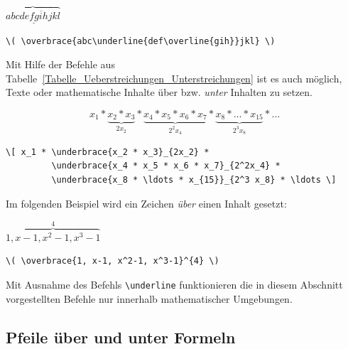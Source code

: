\documentclass[a4paper,10pt,twoside]{scrbook}
\begin{document}
{\begin{minipage}[c]{.3\textwidth}
\setlength{\parskip}{1em}
\centering
\( \overbrace{abc\underline{def\overline{gih}}jkl} \)
\end{minipage}
\hfill
\begin{minipage}[c]{.68\textwidth}
\setlength{\parskip}{1em}
\begin{lstlisting}[label=overbracebeispiel, style=customlatex]
\( \overbrace{abc\underline{def\overline{gih}}jkl} \)
\end{lstlisting}
\end{minipage}



Mit Hilfe der Befehle aus Tabelle~\ref{Tabelle_Ueberstreichungen_Unterstreichungen} 
ist es auch möglich, Texte oder mathematische Inhalte über bzw. \textsl{unter} Inhalten zu setzen.


\[ x_1 * \underbrace{x_2 * x_3}_{2x_2} * 
         \underbrace{x_4 * x_5 * x_6 * x_7}_{2^2x_4} * 
         \underbrace{x_8 * \ldots * x_{15}}_{2^3 x_8} * \ldots \]


\begin{lstlisting}[label=underbracebeispiel, style=customlatex]
\[ x_1 * \underbrace{x_2 * x_3}_{2x_2} * 
         \underbrace{x_4 * x_5 * x_6 * x_7}_{2^2x_4} * 
         \underbrace{x_8 * \ldots * x_{15}}_{2^3 x_8} * \ldots \]
\end{lstlisting}

Im folgenden Beispiel wird ein Zeichen \textsl{über} einen Inhalt gesetzt:

\begin{minipage}[c]{.3\textwidth}
\setlength{\parskip}{1em}
\centering
\( \overbrace{1, x-1, x^2-1, x^3-1}^{4} \)
\end{minipage}
\hfill
\begin{minipage}[c]{.68\textwidth}
\setlength{\parskip}{1em}
\begin{lstlisting}[label=overbracebeispiel2, style=customlatex]
\( \overbrace{1, x-1, x^2-1, x^3-1}^{4} \)
\end{lstlisting}
\end{minipage}


Mit Ausnahme des Befehls \verb!\underline! funktionieren die in diesem Abschnitt vorgestellten Befehle nur innerhalb mathematischer Umgebungen.

\subsection{Pfeile über und unter Formeln}

}
\end{document}
